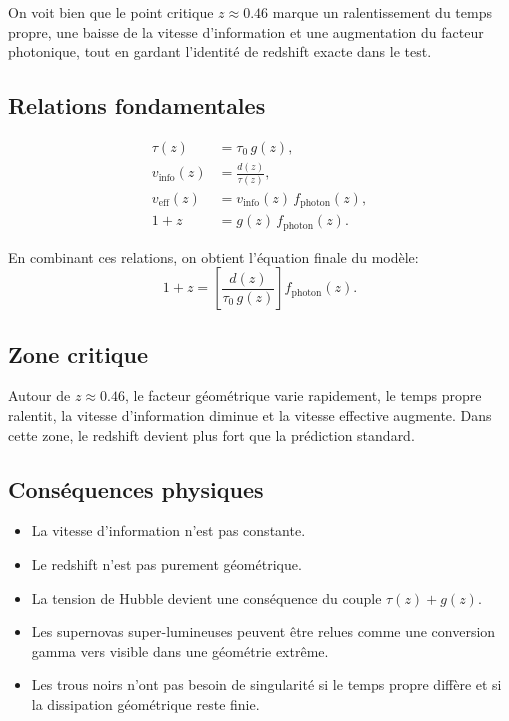 On voit bien que le point critique $z\approx 0.46$ marque un ralentissement du temps propre, une baisse de la vitesse d'information et une augmentation du facteur photonique, tout en gardant l'identité de redshift exacte dans le test.

\subsection{Relations fondamentales}
\begin{align}
    \tau(z) &= \tau_0\,g(z),\\
    v_{\mathrm{info}}(z) &= \frac{d(z)}{\tau(z)},\\
    v_{\mathrm{eff}}(z) &= v_{\mathrm{info}}(z)\,f_{\mathrm{photon}}(z),\\
    1+z &= g(z)\,f_{\mathrm{photon}}(z).
\end{align}

En combinant ces relations, on obtient l'équation finale du modèle:
\[
1+z = \left[\frac{d(z)}{\tau_0\,g(z)}\right] f_{\mathrm{photon}}(z).
\]

\subsection{Zone critique}
Autour de $z\approx0.46$, le facteur géométrique varie rapidement, le temps propre ralentit, la vitesse d'information diminue et la vitesse effective augmente. Dans cette zone, le redshift devient plus fort que la prédiction standard.

\subsection{Conséquences physiques}
\begin{itemize}
    \item La vitesse d'information n'est pas constante.
    \item Le redshift n'est pas purement géométrique.
    \item La tension de Hubble devient une conséquence du couple $\tau(z)+g(z)$.
    \item Les supernovas super-lumineuses peuvent être relues comme une conversion gamma vers visible dans une géométrie extrême.
    \item Les trous noirs n'ont pas besoin de singularité si le temps propre diffère et si la dissipation géométrique reste finie.
\end{itemize}

